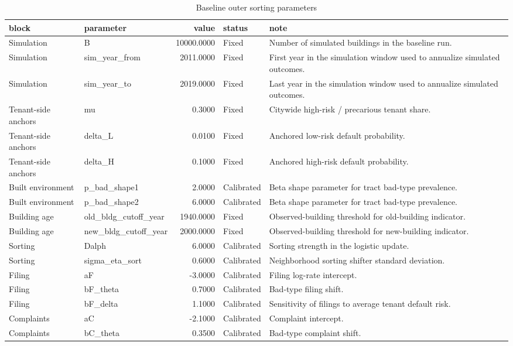 \begin{table}

\caption{Baseline outer sorting parameters}
\centering
\begin{tabular}[t]{llrll}
\toprule
block & parameter & value & status & note\\
\midrule
Simulation & B & 10000.0000 & Fixed & Number of simulated buildings in the baseline run.\\
Simulation & sim\_year\_from & 2011.0000 & Fixed & First year in the simulation window used to annualize simulated outcomes.\\
Simulation & sim\_year\_to & 2019.0000 & Fixed & Last year in the simulation window used to annualize simulated outcomes.\\
Tenant-side anchors & mu & 0.3000 & Fixed & Citywide high-risk / precarious tenant share.\\
Tenant-side anchors & delta\_L & 0.0100 & Fixed & Anchored low-risk default probability.\\
Tenant-side anchors & delta\_H & 0.1000 & Fixed & Anchored high-risk default probability.\\
Built environment & p\_bad\_shape1 & 2.0000 & Calibrated & Beta shape parameter for tract bad-type prevalence.\\
Built environment & p\_bad\_shape2 & 6.0000 & Calibrated & Beta shape parameter for tract bad-type prevalence.\\
Building age & old\_bldg\_cutoff\_year & 1940.0000 & Fixed & Observed-building threshold for old-building indicator.\\
Building age & new\_bldg\_cutoff\_year & 2000.0000 & Fixed & Observed-building threshold for new-building indicator.\\
Sorting & Dalph & 6.0000 & Calibrated & Sorting strength in the logistic update.\\
Sorting & sigma\_eta\_sort & 0.6000 & Calibrated & Neighborhood sorting shifter standard deviation.\\
Filing & aF & -3.0000 & Calibrated & Filing log-rate intercept.\\
Filing & bF\_theta & 0.7000 & Calibrated & Bad-type filing shift.\\
Filing & bF\_delta & 1.1000 & Calibrated & Sensitivity of filings to average tenant default risk.\\
Complaints & aC & -2.1000 & Calibrated & Complaint intercept.\\
Complaints & bC\_theta & 0.3500 & Calibrated & Bad-type complaint shift.\\

\end{tabular}
\end{table}
